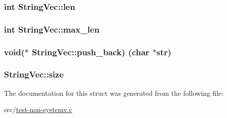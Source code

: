 \subsubsection[{\texorpdfstring{len}{len}}]{\setlength{\rightskip}{0pt plus 5cm}int String\+Vec\+::len}\hypertarget{struct_string_vec_a7c24f16a046318d0be2902e0b40f07e4}{}\label{struct_string_vec_a7c24f16a046318d0be2902e0b40f07e4}
\subsubsection[{\texorpdfstring{max\+\_\+len}{max_len}}]{\setlength{\rightskip}{0pt plus 5cm}int String\+Vec\+::max\+\_\+len}\hypertarget{struct_string_vec_a78df5c5f47656d385e2f6d1f2e9ed62b}{}\label{struct_string_vec_a78df5c5f47656d385e2f6d1f2e9ed62b}
\subsubsection[{\texorpdfstring{push\+\_\+back}{push_back}}]{\setlength{\rightskip}{0pt plus 5cm}void($\ast$  String\+Vec\+::push\+\_\+back) (char $\ast$str)}\hypertarget{struct_string_vec_a8034d98a50a5e9d365f40cf93a80f625}{}\label{struct_string_vec_a8034d98a50a5e9d365f40cf93a80f625}
\subsubsection[{\texorpdfstring{size}{size}}]{ String\+Vec\+::size}\hypertarget{struct_string_vec_ae4ae32f5a45935a1d362357d264b6c2c}{}\label{struct_string_vec_ae4ae32f5a45935a1d362357d264b6c2c}


The documentation for this struct was generated from the following file\+:\begin{DoxyCompactItemize}
\item 
src/\hyperlink{test-non-systemv_8c}{test-\/non-\/systemv.\+c}\end{DoxyCompactItemize}
